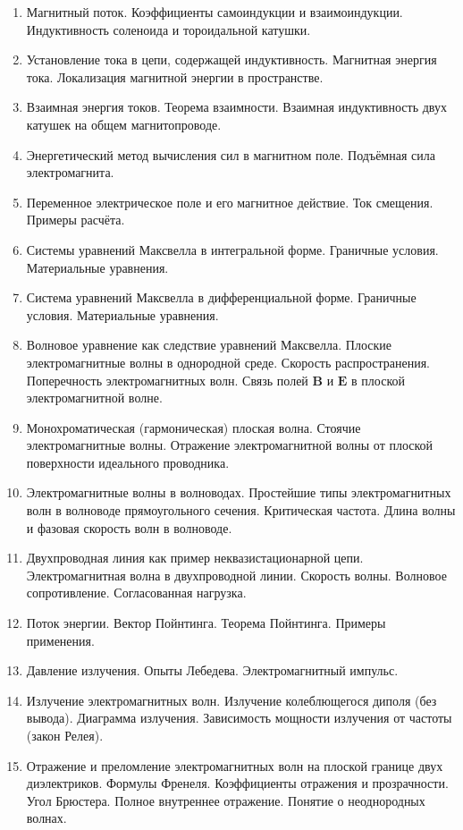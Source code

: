 \documentclass[9pt,a4paper]{article}
\begin{document}
\begin{enumerate}
\item Магнитный поток. Коэффициенты самоиндукции и взаимоиндукции. Индуктивность соленоида и тороидальной катушки.
\item Установление тока в цепи, содержащей индуктивность. Магнитная энергия тока. Локализация магнитной энергии в пространстве.
\item Взаимная энергия токов. Теорема взаимности. Взаимная индуктивность двух катушек на общем магнитопроводе.
\item Энергетический метод вычисления сил в магнитном поле. Подъёмная сила электромагнита.
\item Переменное электрическое поле и его магнитное действие. Ток смещения. Примеры расчёта.
\item Системы уравнений Максвелла в интегральной форме. Граничные условия. Материальные уравнения.
\item Система уравнений Максвелла в дифференциальной форме. Граничные условия. Материальные уравнения.
\item Волновое уравнение как следствие уравнений Максвелла. Плоские электромагнитные волны в однородной среде. Скорость
распространения. Поперечность электромагнитных волн. Связь полей  $\mathbf{B}$ и  $\mathbf{E}$ в плоской электромагнитной волне.
\item Монохроматическая (гармоническая) плоская волна. Стоячие электромагнитные волны. Отражение электромагнитной волны от плоской
поверхности идеального проводника.
\item Электромагнитные волны в волноводах. Простейшие типы электромагнитных волн в волноводе прямоугольного сечения. Критическая
частота. Длина волны и фазовая скорость волн в волноводе.
\item Двухпроводная линия как пример неквазистационарной цепи. Электромагнитная волна в двухпроводной линии. Скорость волны.
Волновое сопротивление. Согласованная нагрузка.
\item Поток энергии. Вектор Пойнтинга. Теорема Пойнтинга. Примеры применения.
\item Давление излучения. Опыты Лебедева. Электромагнитный импульс.
\item Излучение электромагнитных волн. Излучение колеблющегося диполя (без вывода). Диаграмма излучения. Зависимость мощности
излучения от частоты (закон Релея).
\item Отражение и преломление электромагнитных волн на плоской границе двух диэлектриков. Формулы Френеля. Коэффициенты отражения
и прозрачности. Угол Брюстера. Полное внутреннее отражение. Понятие о неоднородных волнах.

\end{enumerate}
\end{document}
